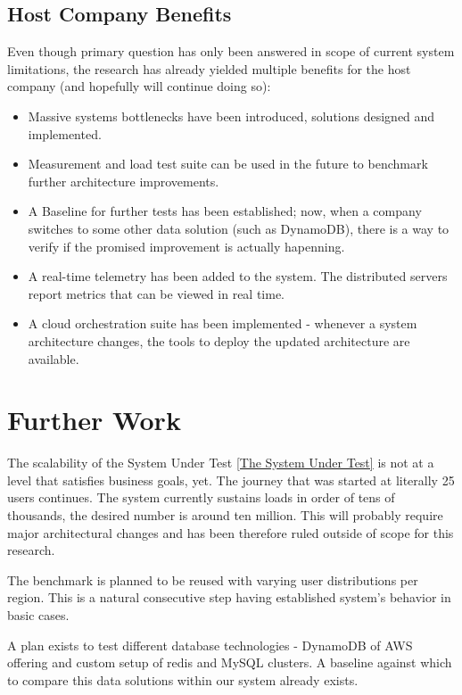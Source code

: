 \documentclass{uvamscse}
\begin{document}
\section{Host Company Benefits}
Even though primary question has only been answered in scope of current system limitations, the research has already yielded multiple benefits for the host company (and hopefully will continue doing so):
\begin{itemize}
  \item Massive systems bottlenecks have been introduced, solutions designed and implemented.
  \item Measurement and load test suite can be used in the future to benchmark further architecture improvements.
  \item A Baseline for further tests has been established; now, when a company switches to some other data solution (such as DynamoDB), there is a way to verify if the promised improvement is actually hapenning.
  \item A real-time telemetry has been added to the system. The distributed servers report metrics that can be viewed in real time.
  \item A cloud orchestration suite has been implemented - whenever a system architecture changes, the tools to deploy the updated architecture are available.
\end{itemize}

\chapter{Further Work}\label{Further Work}

The scalability of the System Under Test \ref{The System Under Test} is not at a level that satisfies business goals, yet. The journey that was started at literally 25 users continues. The system currently sustains loads in order of tens of thousands, the desired number is around ten million. This will probably require major architectural changes and has been therefore ruled outside of scope for this research.


The benchmark is planned to be reused with varying user distributions per region. This is a natural consecutive step having established system's behavior in basic cases.

A plan exists to test different database technologies - DynamoDB of AWS offering and custom setup of redis and MySQL clusters. A baseline against which to compare this data solutions within our system already exists.
\end{document}
